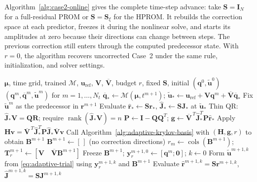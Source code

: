 \documentclass[11pt]{article}
\newcommand{\q}{\mathbf q}
\newcommand{\qbar}{\overline{\mathbf q}}
\newcommand{\uvec}{\mathbf u}
\newcommand{\utilde}{\widetilde{\mathbf u}}
\newcommand{\mub}{\bm\mu}
\begin{document}
Algorithm~\ref{alg:case2-online} gives the complete time-step advance:
take $\mathbf S=\mathbf I_N$ for a full-residual PROM or
$\mathbf S=\mathbf S_\xi$ for the HPROM.  It rebuilds the correction
space at each predictor, freezes it during the nonlinear solve, and starts
its amplitudes at zero because their directions can change between steps.
The previous correction still enters through the computed predecessor
state.  With $r=0$, the algorithm recovers uncorrected Case~2 under the
same rule, initialization, and solver settings.

\begin{algorithm}[H]
\caption{Online advance of Case~2 with optional residual-adaptive correction}
\label{alg:case2-online}
\small
\begin{algorithmic}[1]
\Require $\mub$, time grid, trained $\mathcal M$, $\uvec_{\mathrm{ref}}$,
$\mathbf V$, $\overline{\mathbf V}$, budget $r$, fixed $\mathbf S$,
initial $(\q^0,\utilde^0)$
\Ensure $(\q^m,\qbar^m,\utilde^m)$ for $m=1,\ldots,N_t$
  \State $\qbar_*\gets\mathcal M(\mub,t^{m+1})$;
  $\utilde_*\gets\uvec_{\mathrm{ref}}+\mathbf V\q^m+
  \overline{\mathbf V}\qbar_*$
  \State Fix $\utilde^m$ as the predecessor in $\mathbf r^{m+1}$
    \State Evaluate $\widehat{\mathbf r}_*\gets\mathbf S\mathbf r_*$,
    $\widehat{\mathbf J}_*\gets\mathbf S\mathbf J_*$ at $\utilde_*$
    \State Thin QR: $\widehat{\mathbf J}_*\mathbf V=\mathbf Q\mathbf R$;
    require $\operatorname{rank}(\widehat{\mathbf J}_*\mathbf V)=n$
    \State $\mathbf P\gets\mathbf I-\mathbf Q\mathbf Q^T$;
    $\mathbf g\gets\overline{\mathbf V}^{\,T}
    \widehat{\mathbf J}_*^T\mathbf P\widehat{\mathbf r}_*$
    \State Apply $\mathbf H\mathbf v=
    \overline{\mathbf V}^{\,T}\widehat{\mathbf J}_*^T
    \mathbf P\widehat{\mathbf J}_*\overline{\mathbf V}\mathbf v$
    \State Call Algorithm~\ref{alg:adaptive-krylov-basis} with
    $(\mathbf H,\mathbf g,r)$
    to obtain $\mathbf B^{m+1}$
  \Else
    \State $\mathbf B^{m+1}\gets[\,]$ (no correction directions)
  \EndIf
  \State $r_m\gets\operatorname{cols}(\mathbf B^{m+1})$;
  $\mathbf T_r^{m+1}\gets
  [\mathbf V\quad\overline{\mathbf V}\mathbf B^{m+1}]$
  \State Freeze $\mathbf B^{m+1}$;
  $\mathbf y_r^{m+1,0}\gets[\q^m;\mathbf0]$; $k\gets0$
    \State Form $\utilde^{m+1,k}$ from \eqref{eq:adaptive-trial}
    using $\mathbf y_r^{m+1,k}$ and $\mathbf B^{m+1}$
    \State Evaluate $\widehat{\mathbf r}^{m+1,k}=\mathbf S\mathbf r^{m+1,k}$,
    $\widehat{\mathbf J}^{m+1,k}=\mathbf S\mathbf J^{m+1,k}$

\end{algorithmic}
\end{algorithm}
\end{document}

